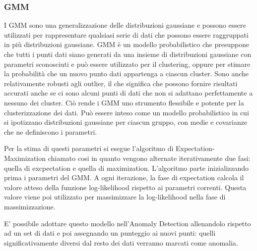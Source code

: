 \subsubsection{GMM}
I GMM sono una generalizzazione delle distribuzioni gaussiane e possono essere utilizzati per rappresentare qualsiasi serie di dati che possono essere raggruppati in più distribuzioni gaussiane. GMM è un modello probabilistico che presuppone che tutti i punti dati siano generati da una insieme di distribuzioni gaussiane con parametri sconosciuti e può essere utilizzato per il clustering, oppure per stimare la probabilità che un nuovo punto dati appartenga a ciascun cluster. Sono anche relativamente robusti agli outlier, il che significa che possono fornire risultati accurati anche se ci sono alcuni punti di dati che non si adattano perfettamente a nessuno dei cluster. Ciò rende i GMM uno strumento flessibile e potente per la clusterizzazione dei dati. Può essere inteso come un modello probabilistico in cui si ipotizzano distribuzioni gaussiane per ciascun gruppo, con medie e covarianze che ne definiscono i parametri.

Per la stima di questi parametri si esegue l'algoritmo di Expectation-Maximization chiamato cosi in quanto vengono alternate iterativamente due fasi: quella di excpectation e quella di maximization. L'algoritmo parte inizializzando prima i parametri del GMM. A ogni iterazione, la fase di expectation calcola il valore atteso della funzione log-likelihood rispetto ai parametri correnti. Questa valore viene poi utilizzato per massimizzare la log-likelihood nella fase di massimizzazione.

E' possibile adottare questo modello nell'Anomaly Detection allenandolo rispetto ad un set di dati e poi assegnando un punteggio ai nuovi punti: quelli significativamente diversi dal resto dei dati verranno marcati come anomalia.


